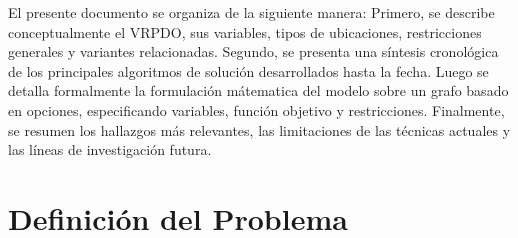 \documentclass[letter, 10pt]{article}
\begin{document}
\vspace{2mm}

El presente documento se organiza de la siguiente manera: Primero, se describe conceptualmente el VRPDO, sus variables, tipos de ubicaciones, restricciones generales y variantes relacionadas. Segundo, se presenta una síntesis cronológica de los principales algoritmos de solución desarrollados hasta la fecha. Luego se detalla formalmente la formulación mátematica del modelo sobre un grafo basado en opciones, especificando variables, función objetivo y restricciones. Finalmente, se resumen los hallazgos más relevantes, las limitaciones de las técnicas actuales y las líneas de investigación futura.


\section{Definici\'on del Problema}
\end{document}

